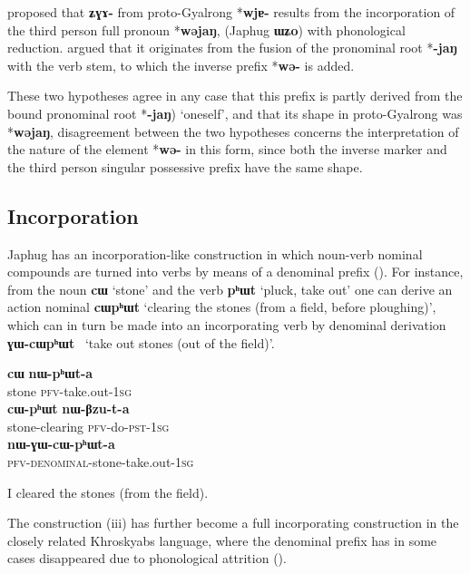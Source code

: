 \documentclass[oldfontcommands,oneside,a4paper,11pt]{article}
\newcommand{\ipa}[1]{\mbox{\phon\textbf{#1}}} %
\begin{document}
\citet{jacques10refl} proposed that \ipa{ʑɣɤ-} from proto-Gyalrong *\ipa{wjɐ-} results from the incorporation of the third person full pronoun *\ipa{wəjaŋ}, (Japhug \ipa{ɯʑo}) with phonological reduction. \citet{jackson14morpho} argued that it originates from the fusion of the pronominal root *\ipa{-jaŋ} with the verb stem, to which the inverse prefix *\ipa{wə-} is added.

These two hypotheses agree in any case that this prefix is partly derived from the bound pronominal root *\ipa{-jaŋ}) `oneself', and that its shape in proto-Gyalrong was *\ipa{wəjaŋ}, disagreement between the two hypotheses concerns the interpretation of the nature of the element *\ipa{wə-} in this form, since both the inverse marker and the third person singular possessive prefix have the same shape.

\subsection{Incorporation}
Japhug has an incorporation-like construction in which noun-verb nominal compounds are turned into verbs by means of a denominal prefix (\citealt{jacques12incorp}). For instance, from the noun \ipa{cɯ} `stone' and the verb \ipa{pʰɯt} `pluck, take out' one can derive an action nominal   \ipa{cɯpʰɯt} `clearing the stones (from a field, before ploughing)', which can in turn be made into an incorporating verb by denominal derivation  \ipa{ɣɯ-cɯpʰɯt } `take out stones (out of the field)'. 

\begin{exe}   
\ex
\begin{xlist}[(ii)]
\gll     \ipa{cɯ} \ipa{nɯ-pʰɯt-a}  \\
  stone \textsc{pfv}-take.out-\textsc{1sg} \\
\gll     \ipa{cɯ-pʰɯt} \ipa{nɯ-βzu-t-a}  \\
  stone-clearing \textsc{pfv}-do-\textsc{pst}-\textsc{1sg} \\
\gll     \ipa{nɯ-ɣɯ-cɯ-pʰɯt-a}  \\
  \textsc{pfv-denominal}-stone-take.out-\textsc{1sg} \\
  \end{xlist}
  \glt   I cleared the stones (from the field). 
\end{exe}   

The construction (iii) has further become a full incorporating construction in the closely related Khroskyabs language, where the denominal prefix has in some cases disappeared due to phonological attrition (\citealt{lai13affixale}).
\end{document}
